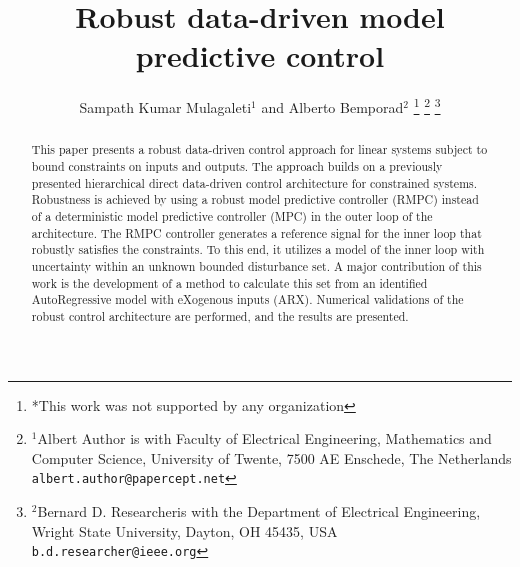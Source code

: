 \documentclass[letterpaper, 10 pt, conference]{ieeeconf}  %
\title{\LARGE \bf
Robust data-driven model predictive control
}
\author{Sampath Kumar Mulagaleti$^{1}$ and Alberto Bemporad$^{2}$%
\thanks{*This work was not supported by any organization}%
\thanks{$^{1}$Albert Author is with Faculty of Electrical Engineering, Mathematics and Computer Science,
        University of Twente, 7500 AE Enschede, The Netherlands
        {\tt\small albert.author@papercept.net}}%
\thanks{$^{2}$Bernard D. Researcheris with the Department of Electrical Engineering, Wright State University,
        Dayton, OH 45435, USA
        {\tt\small b.d.researcher@ieee.org}}%
}
\begin{document}
\maketitle
\thispagestyle{empty}
\pagestyle{empty}


\begin{abstract}

This paper presents a robust data-driven control approach for linear systems subject to bound constraints on inputs and outputs.
 The approach builds on a previously presented hierarchical direct data-driven control architecture for constrained systems. Robustness is achieved by using a robust model predictive controller (RMPC) instead of a deterministic model predictive controller (MPC) in the outer loop of the architecture. The RMPC controller generates a reference signal for the inner loop that robustly satisfies the constraints. To this end, it utilizes a model of the inner loop with uncertainty within an unknown bounded disturbance set. A major contribution of this work is the development of a method to calculate this set from an identified AutoRegressive model with eXogenous inputs (ARX). Numerical validations of the robust control architecture are performed, and the results are presented.

\end{abstract}


\end{document}
